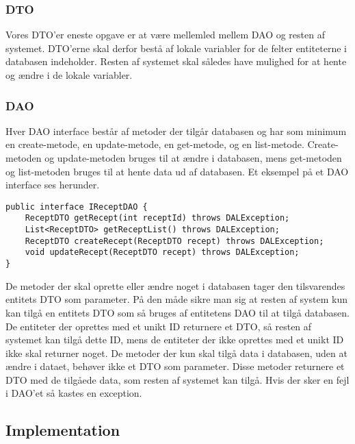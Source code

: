 \documentclass[a4paper]{article}
\begin{document}
\subsubsection{DTO} %

Vores DTO’er eneste opgave er at være mellemled mellem DAO og resten af systemet. DTO’erne skal derfor bestå af lokale variabler for de felter entiteterne i databasen indeholder. Resten af systemet skal således have mulighed for at hente og ændre i de lokale variabler.  


\subsubsection{DAO} %

Hver DAO interface består af metoder der tilgår databasen og har som minimum en create-metode, en update-metode, en get-metode, og en list-metode. Create-metoden og update-metoden bruges til at ændre i databasen, mens get-metoden og list-metoden bruges til at hente data ud af databasen. Et eksempel på et DAO interface ses herunder.

\begin{lstlisting}
public interface IReceptDAO {
	ReceptDTO getRecept(int receptId) throws DALException;
	List<ReceptDTO> getReceptList() throws DALException;
	ReceptDTO createRecept(ReceptDTO recept) throws DALException;
	void updateRecept(ReceptDTO recept) throws DALException;
}
\end{lstlisting}

De metoder der skal oprette eller ændre noget i databasen tager den tilsvarendes entitets DTO som parameter. På den måde sikre man sig at resten af system kun kan tilgå en entitets DTO som så bruges af entitetens DAO til at tilgå databasen. De entiteter der oprettes med et unikt ID returnere et DTO, så resten af systemet kan tilgå dette ID, mens de entiteter der ikke oprettes med et unikt ID ikke skal returner noget.  De metoder der kun skal tilgå data i databasen, uden at ændre i dataet, behøver ikke et DTO som parameter. Disse metoder returnere et DTO med de tilgåede data, som resten af systemet kan tilgå. Hvis der sker en fejl i DAO’et så kastes en exception.



\subsection{Implementation} %
\end{document}
